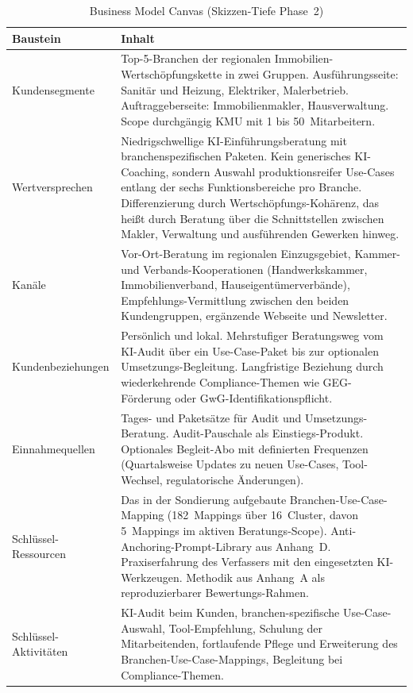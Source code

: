 \documentclass[a4paper,11pt]{article}
\begin{document}
\begin{table}[H]
\centering
\caption{Business Model Canvas (Skizzen-Tiefe Phase~2)}
\label{tab:bmc}
\small
\begin{tabular}{p{3.5cm}p{11cm}}
\toprule
\textbf{Baustein} & \textbf{Inhalt} \\
\midrule
Kundensegmente & Top-5-Branchen der regionalen Immobilien-Wertschöpfungskette in zwei Gruppen. Ausführungsseite: Sanitär und Heizung, Elektriker, Malerbetrieb. Auftraggeberseite: Immobilienmakler, Hausverwaltung. Scope durchgängig KMU mit 1 bis 50~Mitarbeitern. \\
Wertversprechen & Niedrigschwellige KI-Einführungsberatung mit branchen\-spezifischen Paketen. Kein generisches KI-Coaching, sondern Auswahl produktionsreifer Use-Cases entlang der sechs Funktionsbereiche pro Branche. Differenzierung durch Wertschöpfungs-Kohärenz, das heißt durch Beratung über die Schnittstellen zwischen Makler, Verwaltung und ausführenden Gewerken hinweg. \\
Kanäle & Vor-Ort-Beratung im regionalen Einzugs\-gebiet, Kammer- und Verbands-Kooperationen (Handwerkskammer, Immobilien\-verband, Hauseigentümer\-verbände), Empfehlungs-Vermittlung zwischen den beiden Kundengruppen, ergänzende Webseite und Newsletter. \\
Kundenbeziehungen & Persönlich und lokal. Mehrstufiger Beratungsweg vom KI-Audit über ein Use-Case-Paket bis zur optionalen Umsetzungs-Begleitung. Langfristige Beziehung durch wiederkehrende Compliance-Themen wie GEG-Förderung oder GwG-Identifikationspflicht. \\
Einnahmequellen & Tages- und Paketsätze für Audit und Umsetzungs-Beratung. Audit-Pauschale als Einstiegs-Produkt. Optionales Begleit-Abo mit definierten Frequenzen (Quartalsweise Updates zu neuen Use-Cases, Tool-Wechsel, regulatorische Änderungen). \\
Schlüssel-Ressourcen & Das in der Sondierung aufgebaute Branchen-Use-Case-Mapping (182~Mappings über 16~Cluster, davon 5~Mappings im aktiven Beratungs-Scope). Anti-Anchoring-Prompt-Library aus Anhang~D. Praxiserfahrung des Verfassers mit den eingesetzten KI-Werkzeugen. Methodik aus Anhang~A als reproduzierbarer Bewertungs-Rahmen. \\
Schlüssel-Aktivitäten & KI-Audit beim Kunden, branchen-spezifische Use-Case-Auswahl, Tool-Empfehlung, Schulung der Mitarbeitenden, fortlaufende Pflege und Erweiterung des Branchen-Use-Case-Mappings, Begleitung bei Compliance-Themen. \\

\end{tabular}
\end{table}
\end{document}
